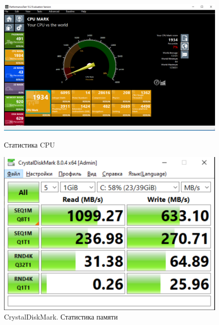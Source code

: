 \documentclass[a4paper,14pt]{extarticle}
\begin{document}
\begin{figure}[h!]
	\centering
	\begin{minipage}[h]{0.48\linewidth}
		\includegraphics[width=1\linewidth]{images/cpu-stat}
		\caption{Статистика CPU}
		\label{fig:cpu-stat}
	\end{minipage}
	\hfill
	\begin{minipage}[h]{0.48\linewidth}
		\includegraphics[width=1\linewidth]{images/crystal-mark}
		\caption{CrystalDiskMark. Статистика памяти}
		\label{fig:crystal-mark}
	\end{minipage}
\end{figure}
\end{document}
